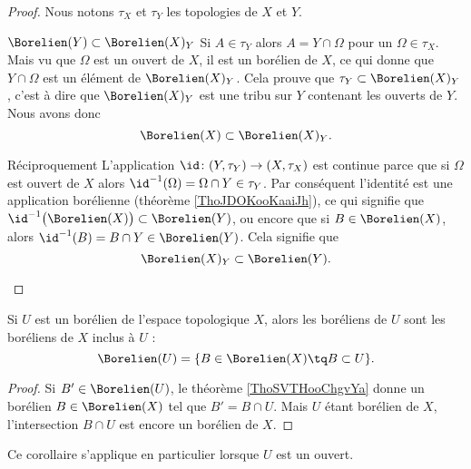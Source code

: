 \begin{proof}
    Nous notons \( \tau_X\) et \( \tau_Y\) les topologies de \( X\) et \( Y\). 
    \begin{subproof}
        \item[\( \Borelien(Y)\subset\Borelien(X)_Y\)]
            Si \( A\in \tau_Y\) alors \( A=Y\cap \Omega\) pour un \( \Omega\in \tau_X\). Mais vu que \(\Omega\) est un ouvert de \( X\), il est un borélien de \( X\), ce qui donne que \( Y\cap\Omega\) est un élément de \( \Borelien(X)_Y\). Cela prouve que \( \tau_Y\subset\Borelien(X)_Y\), c'est à dire que \( \Borelien(X)_Y\) est une tribu sur \( Y\) contenant les ouverts de \( Y\). Nous avons donc
            \begin{equation}
                \Borelien(X)\subset\Borelien(X)_Y.
            \end{equation}
        \item[Réciproquement]
            L'application \( \id\colon (Y,\tau_Y)\to (X,\tau_X)\) est continue parce que si \( \Omega\) est ouvert de \( X\) alors \( \id^{-1}(\Omega)=\Omega\cap Y\in \tau_Y\). Par conséquent l'identité est une application borélienne (théorème \ref{ThoJDOKooKaaiJh}), ce qui signifie que \( \id^{-1}\big( \Borelien(X) \big)\subset\Borelien(Y)\), ou encore que si \( B\in\Borelien(X)\), alors \( \id^{-1}(B)=B\cap Y\in\Borelien(Y)\). Cela signifie que 
            \begin{equation}
                \Borelien(X)_Y\subset \Borelien(Y).
            \end{equation}
    \end{subproof}
\end{proof}

\begin{corollary}       \label{CorooMJQYooFfwoTd}
    Si \( U\) est un borélien de l'espace topologique \( X\), alors les boréliens de \( U\) sont les boréliens de \( X\) inclus à \( U\) :
    \begin{equation}
        \Borelien(U)=\{ B\in\Borelien(X)\tq B\subset U \}.
    \end{equation}
\end{corollary}

\begin{proof}
    Si \( B'\in\Borelien(U)\), le théorème \ref{ThoSVTHooChgvYa} donne un borélien \( B\in\Borelien(X)\) tel que \( B'=B\cap U\). Mais \( U\) étant borélien de \( X\), l'intersection \( B\cap U\) est encore un borélien de \( X\).
\end{proof}
Ce corollaire s'applique en particulier lorsque \( U\) est un ouvert.

